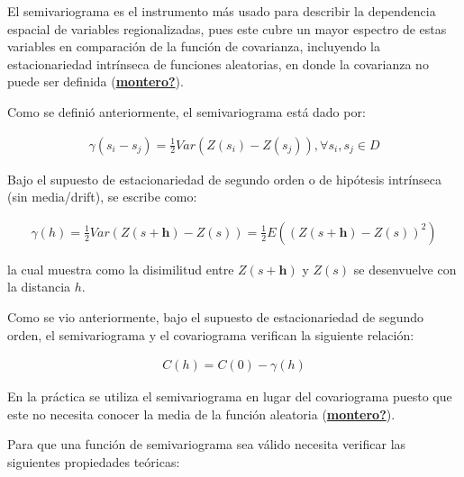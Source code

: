 \documentclass[
]{book}
\begin{document}
El semivariograma es el instrumento más usado para describir la dependencia espacial de variables regionalizadas, pues este cubre un mayor espectro de estas variables en comparación de la función de covarianza, incluyendo la estacionariedad intrínseca de funciones aleatorias, en donde la covarianza no puede ser definida (\protect\hyperlink{ref-montero}{\textbf{montero?}}).

Como se definió anteriormente, el semivariograma está dado por:

\begin{align}
  \gamma(s_i-s_j)=\frac{1}{2}Var(Z(s_i)-Z(s_j)),\forall s_i,s_j \in D  
\end{align}

Bajo el supuesto de estacionariedad de segundo orden o de hipótesis intrínseca (sin media/drift), se escribe como:

\begin{align}
  \gamma(h)=\frac{1}{2}Var(Z(s+\textbf{h})-Z(s))=\frac{1}{2}E((Z(s+\textbf{h})-Z(s))^2)  
\end{align}

la cual muestra como la disimilitud entre \(Z(s+\textbf{h})\) y \(Z(s)\) se desenvuelve con la distancia \(h\).

Como se vio anteriormente, bajo el supuesto de estacionariedad de segundo orden, el semivariograma y el covariograma verifican la siguiente relación:

\begin{align}
  C(h)=C(0)-\gamma(h)  
\end{align}

En la práctica se utiliza el semivariograma en lugar del covariograma puesto que este no necesita conocer la media de la función aleatoria (\protect\hyperlink{ref-montero}{\textbf{montero?}}).

Para que una función de semivariograma sea válido necesita verificar las siguientes propiedades teóricas:
\end{document}
